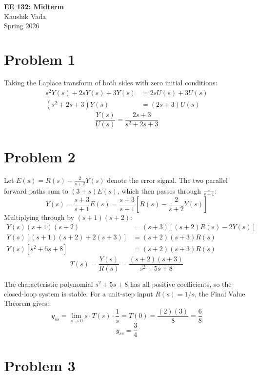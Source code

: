\documentclass[12pt]{article}
\begin{document}
\begin{center}
{\Large \textbf{EE 132: Midterm}}\\[1.5em]
{\large Kaushik Vada}\\[1em]
{\large Spring 2026}
\end{center}

\vspace{1em}

\section*{Problem 1}

Taking the Laplace transform of both sides with zero initial conditions:
\begin{align*}
s^2 Y(s) + 2s Y(s) + 3 Y(s) &= 2s U(s) + 3 U(s) \\[1em]
(s^2 + 2s + 3) Y(s) &= (2s + 3) U(s)
\end{align*}
\[
\boxed{\frac{Y(s)}{U(s)} = \frac{2s + 3}{s^2 + 2s + 3}}
\]

\section*{Problem 2}

Let $E(s) = R(s) - \frac{2}{s + 2} Y(s)$ denote the error signal. The two parallel forward paths sum to $(3 + s) E(s)$, which then passes through $\frac{1}{s + 1}$:
\[
Y(s) = \frac{s + 3}{s + 1} E(s) = \frac{s + 3}{s + 1} \left[ R(s) - \frac{2}{s + 2} Y(s) \right]
\]
Multiplying through by $(s + 1)(s + 2)$:
\begin{align*}
Y(s)(s + 1)(s + 2) &= (s + 3) \left[ (s + 2)R(s) - 2 Y(s) \right] \\
Y(s) \left[ (s + 1)(s + 2) + 2(s + 3) \right] &= (s + 2)(s + 3) R(s) \\
Y(s) \left[ s^2 + 5s + 8 \right] &= (s + 2)(s + 3) R(s)
\end{align*}
\[
\boxed{T(s) = \frac{Y(s)}{R(s)} = \frac{(s + 2)(s + 3)}{s^2 + 5s + 8}}
\]

The characteristic polynomial $s^2 + 5s + 8$ has all positive coefficients, so the closed-loop system is stable. For a unit-step input $R(s) = 1/s$, the Final Value Theorem gives:
\[
y_{ss} = \lim_{s \to 0} s \cdot T(s) \cdot \frac{1}{s} = T(0) = \frac{(2)(3)}{8} = \frac{6}{8}
\]
\[
\boxed{y_{ss} = \frac{3}{4}}
\]

\section*{Problem 3}
\end{document}
